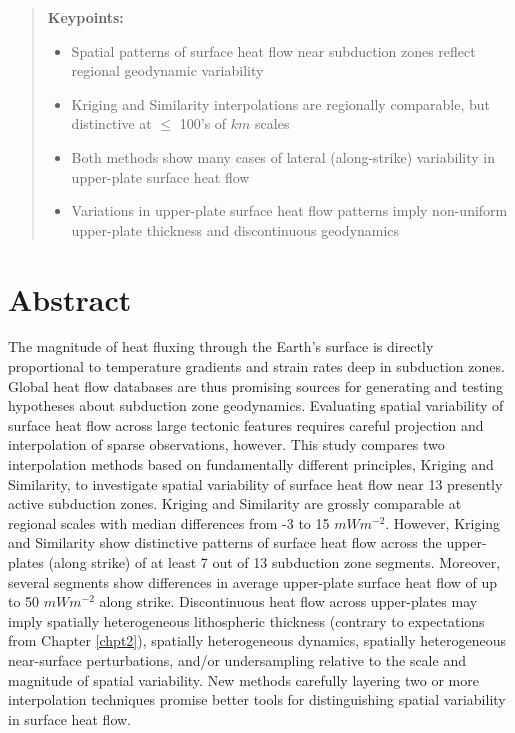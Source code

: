 
\begin{quote}
\textbf{Keypoints:}

\begin{itemize}
\item
  Spatial patterns of surface heat flow near subduction zones reflect regional geodynamic variability
\item
  Kriging and Similarity interpolations are regionally comparable, but distinctive at \(\leq\) 100's of \(km\) scales
\item
  Both methods show many cases of lateral (along-strike) variability in upper-plate surface heat flow
\item
  Variations in upper-plate surface heat flow patterns imply non-uniform upper-plate thickness and discontinuous geodynamics
\end{itemize}
\end{quote}

\hypertarget{chpt3Abstract}{%
\section{Abstract}\label{chpt3Abstract}}

The magnitude of heat fluxing through the Earth's surface is directly proportional to temperature gradients and strain rates deep in subduction zones. Global heat flow databases are thus promising sources for generating and testing hypotheses about subduction zone geodynamics. Evaluating spatial variability of surface heat flow across large tectonic features requires careful projection and interpolation of sparse observations, however. This study compares two interpolation methods based on fundamentally different principles, Kriging and Similarity, to investigate spatial variability of surface heat flow near 13 presently active subduction zones. Kriging and Similarity are grossly comparable at regional scales with median differences from -3 to 15 \(mWm^{-2}\). However, Kriging and Similarity show distinctive patterns of surface heat flow across the upper-plates (along strike) of at least 7 out of 13 subduction zone segments. Moreover, several segments show differences in average upper-plate surface heat flow of up to 50 \(mWm^{-2}\) along strike. Discontinuous heat flow across upper-plates may imply spatially heterogeneous lithospheric thickness (contrary to expectations from Chapter \ref{chpt2}), spatially heterogeneous dynamics, spatially heterogeneous near-surface perturbations, and/or undersampling relative to the scale and magnitude of spatial variability. New methods carefully layering two or more interpolation techniques promise better tools for distinguishing spatial variability in surface heat flow.

